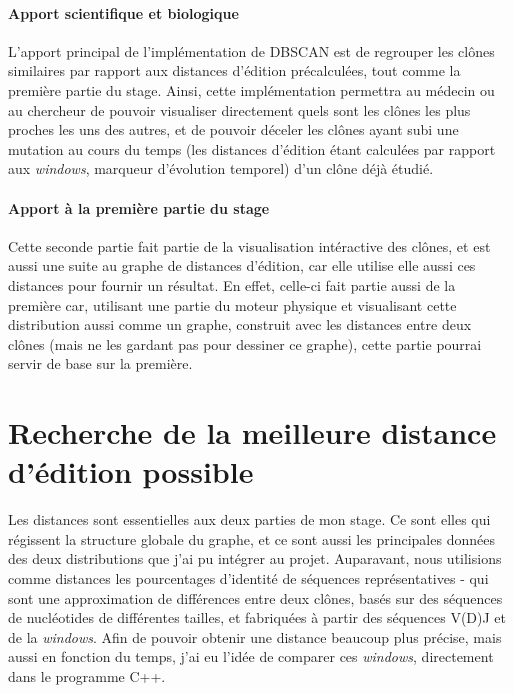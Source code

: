 \documentclass[12pt]{report}
\begin{document}
\begin{spacing}{1.2}
\subsubsection{Apport scientifique et biologique}

L'apport principal de l'implémentation de DBSCAN est de regrouper les clônes similaires par rapport aux distances d'édition précalculées, tout comme la première partie du stage.
\newline
Ainsi, cette implémentation permettra au médecin ou au chercheur de pouvoir visualiser directement quels sont les clônes les plus proches les uns des autres, et de pouvoir déceler les clônes ayant subi une mutation au cours du temps (les distances d'édition étant calculées par rapport aux \textit{windows}, marqueur d'évolution temporel) d'un clône déjà étudié.

\subsubsection{Apport à la première partie du stage}

Cette seconde partie fait partie de la visualisation intéractive des clônes, et est aussi une suite au graphe de distances d'édition, car elle utilise elle aussi ces distances pour fournir un résultat.
\newline
En effet, celle-ci fait partie aussi de la première car, utilisant une partie du moteur physique et visualisant cette distribution aussi comme un graphe, construit avec les distances entre deux clônes (mais ne les gardant pas pour dessiner ce graphe), cette partie pourrai servir de base sur la première.

\chapter{Recherche de la meilleure distance d'édition possible}

Les distances sont essentielles aux deux parties de mon stage. Ce sont elles qui régissent la structure globale du graphe, et ce sont aussi les principales données des deux distributions que j'ai pu intégrer au projet.
\newline
Auparavant, nous utilisions comme distances les pourcentages d'identité de séquences représentatives - qui sont une approximation de différences entre deux clônes, basés sur des séquences de nucléotides de différentes tailles, et fabriquées à partir des séquences V(D)J et de la \textit{windows}.
\newline
Afin de pouvoir obtenir une distance beaucoup plus précise, mais aussi en fonction du temps, j'ai eu l'idée de comparer ces \textit{windows}, directement dans le programme C++.


\end{spacing}
\end{document}
